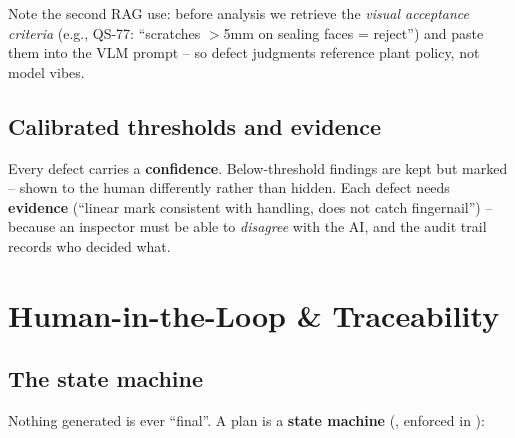 \begin{center}
\end{center}

Note the second RAG use: before analysis we retrieve the \emph{visual acceptance
criteria} (e.g., QS-77: ``scratches $>$5mm on sealing faces = reject'') and paste them
into the VLM prompt -- so defect judgments reference plant policy, not model vibes.

\subsection{Calibrated thresholds and evidence}
Every defect carries a \textbf{confidence}. Below-threshold findings are kept but
marked  -- shown to the human differently rather than
hidden. Each defect needs \textbf{evidence} (``linear mark consistent with handling,
does not catch fingernail'') -- because an inspector must be able to \emph{disagree}
with the AI, and the audit trail records who decided what.

\section{Human-in-the-Loop \& Traceability}

\subsection{The state machine}
Nothing generated is ever ``final''. A plan is a \textbf{state machine}
(, enforced in ):

